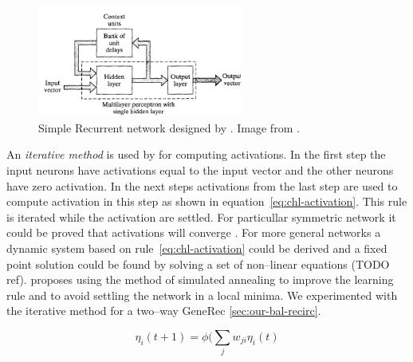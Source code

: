 \begin{figure}[H]
  \centering
  \includegraphics[width=0.6\textwidth]{img/theory-recurrent.png}    
  \caption{Simple Recurrent network designed by \citet{elman1990finding}. Image from \citep{haykin1994neural}.} 
  \label{fig:theory-recurrent}
\end{figure}

An \emph{iterative method} is used by \citet{movellan1990contrastive} for computing activations. In the first step the input neurons have activations equal to the input vector and the other neurons have zero activation. In the next steps activations from the last step are used to compute activation in this step as shown in equation~\ref{eq:chl-activation}. This rule is iterated while the activation are settled. For particullar symmetric network it could be proved that activations will converge \citep{o1996bio}. For more general networks a dynamic system based on rule~\ref{eq:chl-activation} could be derived and a fixed point solution could be found by solving a set of non--linear equations (TODO ref). \citet{movellan1990contrastive} proposes using the method of simulated annealing \citep{kirkpatrick1983optimization,vcerny1985thermodynamical} to improve the learning rule and to avoid settling the network in a local minima. We experimented with the iterative method for a two--way GeneRec \ref{sec:our-bal-recirc}. 

\begin{equation}
\label{eq:chl-activation} 
\eta_i(t+1) = \phi(\sum_j w_{ji}\eta_i(t)
\end{equation}
